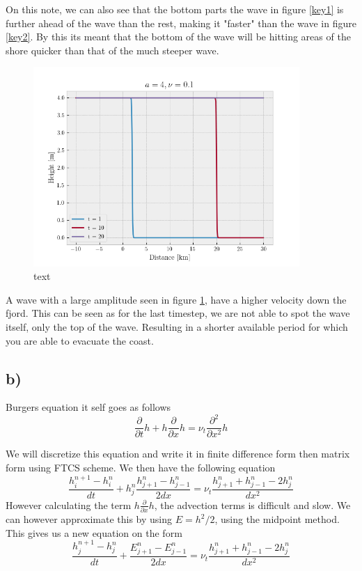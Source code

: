\documentclass[10pt, a4paper]{amsart}
\begin{document}
On this note, we can also see that the bottom parts the wave in figure \ref{key1} is further ahead of the wave than the rest, making it "faster" than the wave in figure \ref{key2}. By this its meant that the bottom of the wave will be hitting areas of the shore quicker than that of the much steeper wave. 

\begin{figure}
	\centering
	\includegraphics[width=0.9\textwidth]{../code/1a4.png}
	\caption{text}
	\label{key3}
\end{figure}
A wave with a large amplitude seen in figure \ref{key3}, have a higher velocity down the fjord. This can be seen as for the last timestep, we are not able to spot the wave itself, only the top of the wave. Resulting in a shorter available period for which you are able to evacuate the coast. 

\subsection{b)}
Burgers equation it self goes as follows 
\begin{equation}
	\frac{\partial }{\partial t}h + h\frac{\partial}{\partial x}h = \nu_t \frac{\partial^2}{\partial x^2}h
\end{equation}

We will discretize this equation and write it in finite difference form then matrix form using FTCS scheme. We then have the following equation 
\begin{equation}
	\frac{h_i^{n+1}- h_i^n}{dt} + h_j^n\frac{h_{j+1}^n-h_{j-1}^n}{2dx} = \nu_t\frac{h^n_{j+1} + h^n_{j-1} - 2h_j^n}{dx^2}
\end{equation}
However calculating the term $h\frac{\partial}{\partial x}h$, the advection terms is difficult and slow. We can however approximate this by using $E = h^2/2$, using the midpoint method. This gives us a new equation on the form 
\begin{equation}
		\frac{h_j^{n+1}- h_j^n}{dt} +\frac{E_{j+1}^n-E_{j-1}^n}{2dx} = \nu_t\frac{h^n_{j+1} + h^n_{j-1} - 2h_j^n}{dx^2}
\end{equation}
\end{document}
